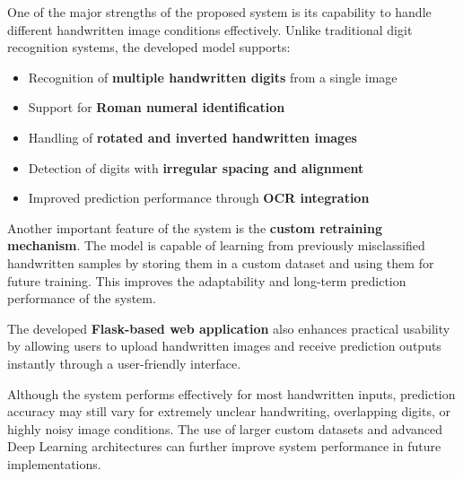 \documentclass[12pt,a4paper]{article}
\begin{document}
\vspace{0.3cm}

\noindent
One of the major strengths of the proposed system is its capability to handle different handwritten image conditions effectively. Unlike traditional digit recognition systems, the developed model supports:

\begin{itemize}

\item Recognition of \textbf{multiple handwritten digits} from a single image

\item Support for \textbf{Roman numeral identification}

\item Handling of \textbf{rotated and inverted handwritten images}

\item Detection of digits with \textbf{irregular spacing and alignment}

\item Improved prediction performance through \textbf{OCR integration}

\end{itemize}

\vspace{0.3cm}

\noindent
Another important feature of the system is the \textbf{custom retraining mechanism}. The model is capable of learning from previously misclassified handwritten samples by storing them in a custom dataset and using them for future training. This improves the adaptability and long-term prediction performance of the system.

\vspace{0.3cm}

\noindent
The developed \textbf{Flask-based web application} also enhances practical usability by allowing users to upload handwritten images and receive prediction outputs instantly through a user-friendly interface.

\vspace{0.3cm}

\noindent
Although the system performs effectively for most handwritten inputs, prediction accuracy may still vary for extremely unclear handwriting, overlapping digits, or highly noisy image conditions. The use of larger custom datasets and advanced Deep Learning architectures can further improve system performance in future implementations.
\end{document}
